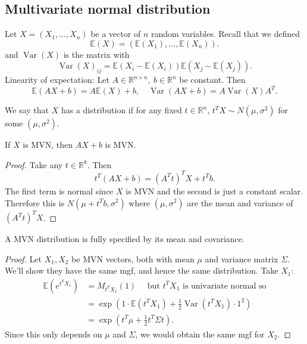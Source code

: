 \documentclass[egregdoesnotlikesansseriftitles,a4paper]{scrartcl}
\begin{document}
\subsection{Multivariate normal distribution}
Let $X = (X_1 , \ldots, X_n)$ be a vector of $n$ random variables. Recall that we defined \[
     \mathbb{E}(X)= \left(\mathbb{E}(X_1 ),\ldots, \mathbb{E}(X_{n})\right)
.\] and $\operatorname{Var}(X)$ is the matrix with \[
     \operatorname{Var}(X)_{ij}= \mathbb{E}(X_{i}-\mathbb{E}(X_{i}))\mathbb{E}(X_{j}-\mathbb{E}(X_{j}))
.\] Linearity of expectation: Let $A \in \mathbb{R}^{n \times n}, \ b \in \mathbb{R}^{n}$ be constant. Then \[
\mathbb{E}(AX+b)=A \mathbb{E}(X)+b, \quad \operatorname{Var}(AX+b)=A \operatorname{Var}(X)A^{T}
.\] 
\begin{definition*}
      We say that $X$ has a  distribution if for any fixed $t \in \mathbb{R}^{n}$, $t^T X \sim N (\mu, \sigma^2)$ for some $(\mu, \sigma^2)$.
\end{definition*}
\begin{proposition}
      If $X$ is MVN, then $AX+b $ is MVN.
      \begin{proof}
            Take any $t \in \mathbb{R}^{k}$. Then \[
            t^T (AX+b)= (A^{T}t)^{T}X+ t^T b
            .\] The first term is normal since $X$ is MVN and the second is just a constant scalar. Therefore this is $N (\mu+t^T b ,\sigma^2)$ where $(\mu, \sigma^2)$ are the mean and variance of $(A^{T}t)^{T}X$.
      \end{proof}
\end{proposition}
\begin{proposition}
      A MVN distribution is fully specified by its mean and covariance.
      \begin{proof}
            Let $X_1 , X_2 $ be MVN vectors, both with mean $\mu$ and variance matrix $\Sigma$. We'll show they have the same mgf, and hence the same distribution. Take $X_1 $:
            \begin{align*}
                 \mathbb{E} (e^{t^TX_1 })&= M_{t^TX_1 }(1) \quad \text{ but } t^TX_1 \text{ is univariate normal so} \\
                 &=\exp \left(1 \cdot \mathbb{E}(t^TX_1 )+\frac{1}{2}\operatorname{Var}(t^TX_1 )\cdot 1^2\right)\\
                 &=\exp \left( t^T \mu+ \frac{1}{2}t^T \Sigma t\right).
            \end{align*}
            Since this only depends on $\mu$ and $\Sigma$, we would obtain the same mgf for $X_2 $.
      \end{proof}
\end{proposition}
\end{document}
